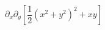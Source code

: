 \documentclass[nofonts]{ctexart}
\begin{document}
\[
	\partial_x \partial_y \left[
		\frac{1}{2} \left( x^2+y^2 \right)^2 +xy
	\right]
\]
\end{document}
